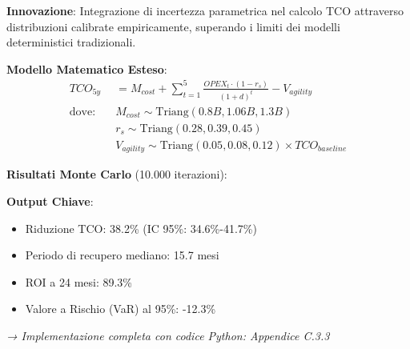 \begin{tcolorbox}[
    colback=orange!5!white,
    colframe=orange!65!black,
    title={\textbf{Innovation Box 3.1:} Modello TCO Stocastico per Cloud Migration},
    fonttitle=\bfseries,
    boxrule=1.5pt,
    arc=2mm,
    breakable
]
\textbf{Innovazione}: Integrazione di incertezza parametrica nel calcolo TCO attraverso distribuzioni calibrate empiricamente, superando i limiti dei modelli deterministici tradizionali.

\vspace{0.3cm}
\textbf{Modello Matematico Esteso}:
\begin{align*}
TCO_{5y} &= M_{cost} + \sum_{t=1}^{5} \frac{OPEX_t \cdot (1-r_s)}{(1+d)^t} - V_{agility} \\
\text{dove:} \quad & M_{cost} \sim \text{Triang}(0.8B, 1.06B, 1.3B) \\
& r_s \sim \text{Triang}(0.28, 0.39, 0.45) \\
& V_{agility} \sim \text{Triang}(0.05, 0.08, 0.12) \times TCO_{baseline}
\end{align*}

\vspace{0.3cm}
\textbf{Risultati Monte Carlo} (10.000 iterazioni):
\begin{center}
\end{center}

\textbf{Output Chiave}:
\begin{itemize}
    \item Riduzione TCO: 38.2\% (IC 95\%: 34.6\%-41.7\%)
    \item Periodo di recupero mediano: 15.7 mesi
    \item ROI a 24 mesi: 89.3\%
    \item Valore a Rischio (VaR) al 95\%: -12.3\%
\end{itemize}

\textit{→ Implementazione completa con codice Python: Appendice C.3.3}
\end{tcolorbox}

